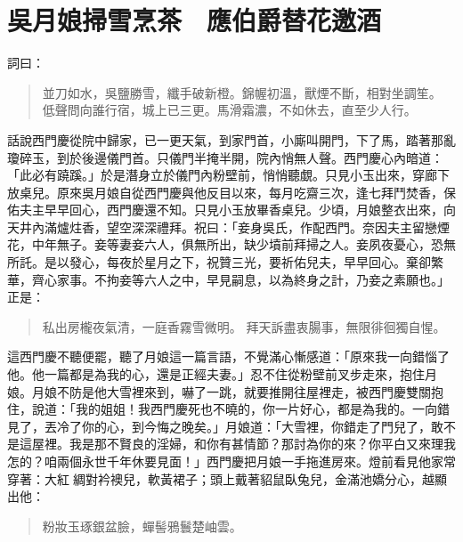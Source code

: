 
\chapter{吳月娘掃雪烹茶　應伯爵替花邀酒}

詞曰：
\begin{quote}
並刀如水，吳鹽勝雪，纖手破新橙。錦幄初溫，獸煙不斷，相對坐調笙。
低聲問向誰行宿，城上已三更。馬滑霜濃，不如休去，直至少人行。
\end{quote}

話說西門慶從院中歸家，已一更天氣，到家門首，小廝叫開門，下了馬，踏著那亂瓊碎玉，到於後邊儀門首。只儀門半掩半開，院內悄無人聲。西門慶心內暗道：「此必有蹺蹊。」於是潛身立於儀門內粉壁前，悄悄聽覷。只見小玉出來，穿廊下放桌兒。原來吳月娘自從西門慶與他反目以來，每月吃齋三次，逢七拜鬥焚香，保佑夫主早早回心，西門慶還不知。只見小玉放畢香桌兒。少頃，月娘整衣出來，向天井內滿爐炷香，望空深深禮拜。祝曰：「妾身吳氏，作配西門。奈因夫主留戀煙花，中年無子。妾等妻妾六人，俱無所出，缺少墳前拜掃之人。妾夙夜憂心，恐無所託。是以發心，每夜於星月之下，祝贊三光，要祈佑兒夫，早早回心。棄卻繁華，齊心家事。不拘妾等六人之中，早見嗣息，以為終身之計，乃妾之素願也。」正是：
\begin{quote}
私出房櫳夜氣清，一庭香霧雪微明。
拜天訴盡衷腸事，無限徘徊獨自惺。
\end{quote}

這西門慶不聽便罷，聽了月娘這一篇言語，不覺滿心慚感道：「原來我一向錯惱了他。他一篇都是為我的心，還是正經夫妻。」忍不住從粉壁前叉步走來，抱住月娘。月娘不防是他大雪裡來到，嚇了一跳，就要推開往屋裡走，被西門慶雙關抱住，說道：「我的姐姐！我西門慶死也不曉的，你一片好心，都是為我的。一向錯見了，丟冷了你的心，到今悔之晚矣。」月娘道：「大雪裡，你錯走了門兒了，敢不是這屋裡。我是那不賢良的淫婦，和你有甚情節？那討為你的來？你平白又來理我怎的？咱兩個永世千年休要見面！」西門慶把月娘一手拖進房來。燈前看見他家常穿著：大紅𫄉綢對衿襖兒，軟黃裙子；頭上戴著貂鼠臥兔兒，金滿池嬌分心，越顯出他：
\begin{quote}
粉妝玉琢銀盆臉，蟬髻鴉鬟楚岫雲。
\end{quote}

